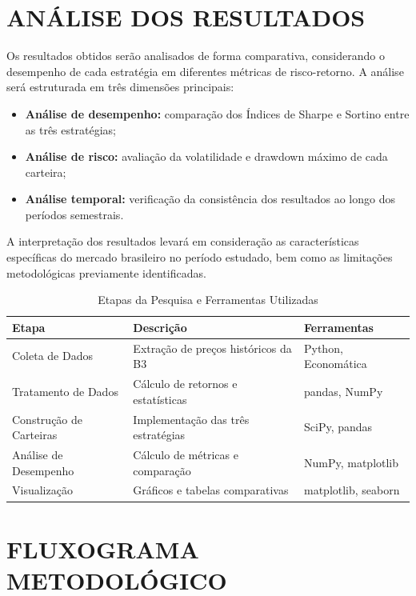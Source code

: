 \section{ANÁLISE DOS RESULTADOS}

Os resultados obtidos serão analisados de forma comparativa, considerando o desempenho de cada estratégia em diferentes métricas de risco-retorno. A análise será estruturada em três dimensões principais:

\begin{itemize}
    \item \textbf{Análise de desempenho:} comparação dos Índices de Sharpe e Sortino entre as três estratégias;
    \item \textbf{Análise de risco:} avaliação da volatilidade e drawdown máximo de cada carteira;
    \item \textbf{Análise temporal:} verificação da consistência dos resultados ao longo dos períodos semestrais.
\end{itemize}

A interpretação dos resultados levará em consideração as características específicas do mercado brasileiro no período estudado, bem como as limitações metodológicas previamente identificadas.


\begin{table}[h]
\centering
\caption{Etapas da Pesquisa e Ferramentas Utilizadas}
\begin{tabular}{|p{4cm}|p{4cm}|p{4cm}|}
\hline
\textbf{Etapa} & \textbf{Descrição} & \textbf{Ferramentas} \\
\hline
Coleta de Dados & Extração de preços históricos da B3 & Python, Economática \\
\hline
Tratamento de Dados & Cálculo de retornos e estatísticas & pandas, NumPy \\
\hline
Construção de Carteiras & Implementação das três estratégias & SciPy, pandas \\
\hline
Análise de Desempenho & Cálculo de métricas e comparação & NumPy, matplotlib \\
\hline
Visualização & Gráficos e tabelas comparativas & matplotlib, seaborn \\
\hline
\end{tabular}
\label{tab:etapas_pesquisa}
\end{table}

\section{FLUXOGRAMA METODOLÓGICO}

